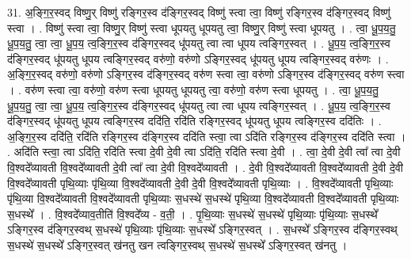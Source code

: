 \documentclass[17pt]{extarticle}
\begin{document}
31. अ॒ङ्गि॒र॒स्वद् विष्णु॒र् विष्णु॑ रङ्गिर॒स्व द॑ङ्गिर॒स्वद् विष्णु॑ स्त्वा त्वा॒ विष्णु॑ रङ्गिर॒स्व द॑ङ्गिर॒स्वद् विष्णु॑ स्त्वा । . विष्णु॑ स्त्वा त्वा॒ विष्णु॒र् विष्णु॑ स्त्वा धूपयतु धूपयतु त्वा॒ विष्णु॒र् विष्णु॑ स्त्वा धूपयतु । . त्वा॒ धू॒प॒य॒तु॒ धू॒प॒य॒तु॒ त्वा॒ त्वा॒ धू॒प॒य॒ त्व॒ङ्गि॒र॒स्व द॑ङ्गिर॒स्वद् धू॑पयतु त्वा त्वा धूपय त्वङ्गिर॒स्वत् । . धू॒प॒य॒ त्व॒ङ्गि॒र॒स्व द॑ङ्गिर॒स्वद् धू॑पयतु धूपय त्वङ्गिर॒स्वद् वरु॑णो॒ वरु॑णो ऽङ्गिर॒स्वद् धू॑पयतु धूपय त्वङ्गिर॒स्वद् वरु॑णः । . अ॒ङ्गि॒र॒स्वद् वरु॑णो॒ वरु॑णो ऽङ्गिर॒स्व द॑ङ्गिर॒स्वद् वरु॑ण स्त्वा त्वा॒ वरु॑णो ऽङ्गिर॒स्व द॑ङ्गिर॒स्वद् वरु॑ण स्त्वा । . वरु॑ण स्त्वा त्वा॒ वरु॑णो॒ वरु॑ण स्त्वा धूपयतु धूपयतु त्वा॒ वरु॑णो॒ वरु॑ण स्त्वा धूपयतु । . त्वा॒ धू॒प॒य॒तु॒ धू॒प॒य॒तु॒ त्वा॒ त्वा॒ धू॒प॒य॒ त्व॒ङ्गि॒र॒स्व द॑ङ्गिर॒स्वद् धू॑पयतु त्वा त्वा धूपय त्वङ्गिर॒स्वत् । . धू॒प॒य॒ त्व॒ङ्गि॒र॒स्व द॑ङ्गिर॒स्वद् धू॑पयतु धूपय त्वङ्गिर॒स्व ददि॑ति॒ रदि॑ति रङ्गिर॒स्वद् धू॑पयतु धूपय त्वङ्गिर॒स्व ददि॑तिः । . अ॒ङ्गि॒र॒स्व ददि॑ति॒ रदि॑ति रङ्गिर॒स्व द॑ङ्गिर॒स्व ददि॑ति स्त्वा॒ त्वा ऽदि॑ति रङ्गिर॒स्व द॑ङ्गिर॒स्व ददि॑ति स्त्वा । . अदि॑ति स्त्वा॒ त्वा ऽदि॑ति॒ रदि॑ति स्त्वा दे॒वी दे॒वी त्वा ऽदि॑ति॒ रदि॑ति स्त्वा दे॒वी । . त्वा॒ दे॒वी दे॒वी त्वा᳚ त्वा दे॒वी वि॒श्वदे᳚व्यावती वि॒श्वदे᳚व्यावती दे॒वी त्वा᳚ त्वा दे॒वी वि॒श्वदे᳚व्यावती । . दे॒वी वि॒श्वदे᳚व्यावती वि॒श्वदे᳚व्यावती दे॒वी दे॒वी वि॒श्वदे᳚व्यावती पृथि॒व्याः पृ॑थि॒व्या वि॒श्वदे᳚व्यावती दे॒वी दे॒वी वि॒श्वदे᳚व्यावती पृथि॒व्याः । . वि॒श्वदे᳚व्यावती पृथि॒व्याः पृ॑थि॒व्या वि॒श्वदे᳚व्यावती वि॒श्वदे᳚व्यावती पृथि॒व्याः स॒धस्थे॑ स॒धस्थे॑ पृथि॒व्या वि॒श्वदे᳚व्यावती वि॒श्वदे᳚व्यावती पृथि॒व्याः स॒धस्थे᳚ । . वि॒श्वदे᳚व्याव॒तीति॑ वि॒श्वदे᳚व्य - व॒ती॒ । . पृ॒थि॒व्याः स॒धस्थे॑ स॒धस्थे॑ पृथि॒व्याः पृ॑थि॒व्याः स॒धस्थे᳚ ऽङ्गिर॒स्व द॑ङ्गिर॒स्वथ् स॒धस्थे॑ पृथि॒व्याः पृ॑थि॒व्याः स॒धस्थे᳚ ऽङ्गिर॒स्वत् । . स॒धस्थे᳚ ऽङ्गिर॒स्व द॑ङ्गिर॒स्वथ् स॒धस्थे॑ स॒धस्थे᳚ ऽङ्गिर॒स्वत् ख॑नतु खन त्वङ्गिर॒स्वथ् स॒धस्थे॑ स॒धस्थे᳚ ऽङ्गिर॒स्वत् ख॑नतु । \newline
\end{document}
